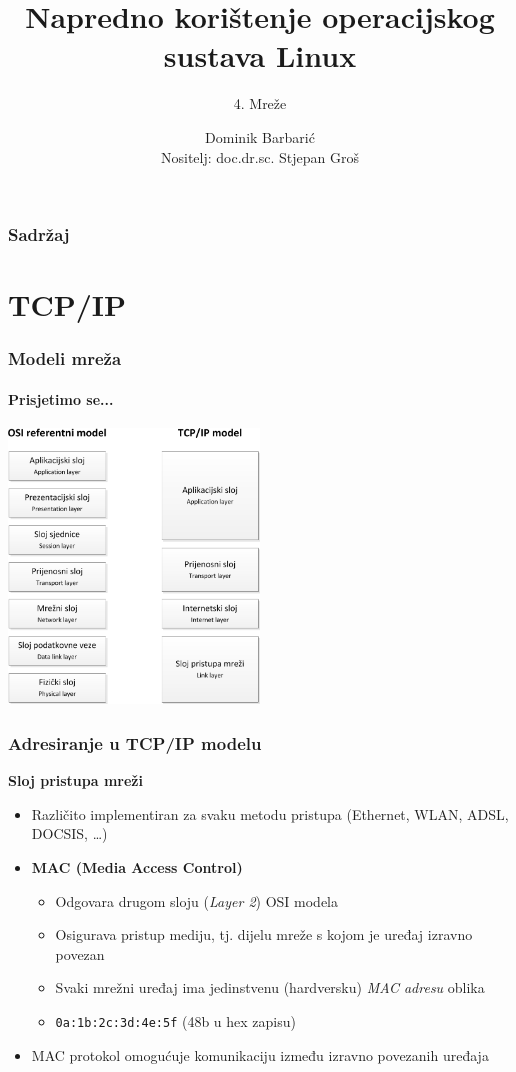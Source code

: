 \documentclass[t,table,usenames,dvipsnames]{beamer}
\date{\todayiso}
\title[NKOSL]{Napredno korištenje operacijskog sustava Linux}
\author[Dominik Barbarić]{Dominik Barbarić\\{\small Nositelj: doc.dr.sc. Stjepan Groš}}
\subtitle{4. Mreže}
\institute[FER]{Sveučilište u Zagrebu\\Fakultet elektrotehnike i računarstva}
\begin{document}
{
	\begin{frame}
		\maketitle
	\end{frame}
}

\begin{frame}
	\frametitle{Sadržaj}
	\tableofcontents
\end{frame}

\section{TCP/IP}

\begin{frame}
	\frametitle{Modeli mreža}
	\framesubtitle{Prisjetimo se...}
	\centering
	\includegraphics[width=0.5\textwidth]{osi_tcpip.png}
\end{frame}


\begin{frame}
	\frametitle{Adresiranje u TCP/IP modelu}
	\textbf{Sloj pristupa mreži}
	\begin{itemize}
		\item Različito implementiran za svaku metodu pristupa (Ethernet, WLAN, ADSL, DOCSIS, \dots)
	\end{itemize}
	\vfill
	\begin{itemize}
		\item \textbf{MAC (Media Access Control)}
		\begin{itemize}
			\item Odgovara drugom sloju (\textit{Layer 2}) OSI modela
			\item Osigurava pristup mediju, tj. dijelu mreže s kojom je uređaj izravno povezan
			\item Svaki mrežni uređaj ima jedinstvenu (hardversku) \emph{MAC adresu} oblika
			\item[] \texttt{0a:1b:2c:3d:4e:5f} \hfill (48b u hex zapisu) \hfill \,
		\end{itemize}
		\item MAC protokol omogućuje komunikaciju između izravno povezanih uređaja
	\end{itemize}
\end{frame}
\end{document}
